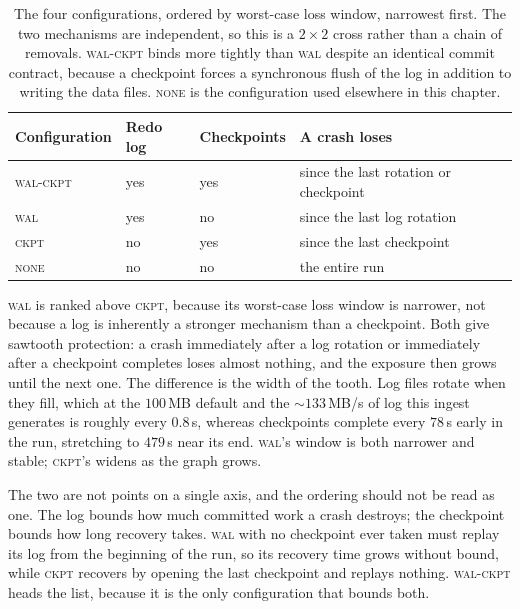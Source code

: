 \begin{table}[t]
  \centering
  \setlength{\tabcolsep}{4pt}\renewcommand{\arraystretch}{1.05}
  \small
  \begin{tabular}{l l l l}
  \toprule
  Configuration & Redo log & Checkpoints & A crash loses \\
  \midrule
  \textsc{wal-ckpt} & yes & yes & since the last rotation or checkpoint \\
  \textsc{wal}      & yes & no  & since the last log rotation \\
  \textsc{ckpt}     & no  & yes & since the last checkpoint \\
  \textsc{none}     & no  & no  & the entire run \\
  \bottomrule
  \end{tabular}
  \caption{The four configurations, ordered by worst-case loss window, narrowest first. The two mechanisms are independent, so this is a $2\times2$ cross rather than a chain of removals. \textsc{wal-ckpt} binds more tightly than \textsc{wal} despite an identical commit contract, because a checkpoint forces a synchronous flush of the log in addition to writing the data files.
  \textsc{none} is the configuration used elsewhere in this chapter.}
  \label{tab:durability-configs}
\end{table}

\textsc{wal} is ranked above \textsc{ckpt}, because its worst-case loss window is
narrower, not because a log is inherently a stronger mechanism than a
checkpoint. Both give sawtooth protection: a crash immediately after a log
rotation or immediately after a checkpoint completes loses almost nothing, and
the exposure then grows until the next one. The difference is the width of
the tooth. Log files rotate when they fill, which at the $100$\,MB default and
the ${\sim}133$\,MB/s of log this ingest generates is roughly every $0.8$\,s,
whereas checkpoints complete every $78$\,s early in the run, stretching to
$479$\,s near its end. \textsc{wal}'s window is both narrower and stable;
\textsc{ckpt}'s widens as the graph grows.

The two are not points on a single axis, and the ordering should not be read as
one. The log bounds how much committed work a crash destroys; the checkpoint
bounds how long recovery takes. \textsc{wal} with no checkpoint ever taken must
replay its log from the beginning of the run, so its recovery time grows without
bound, while \textsc{ckpt} recovers by opening the last checkpoint and replays
nothing. \textsc{wal-ckpt} heads the list, because it is the only configuration
that bounds both.

